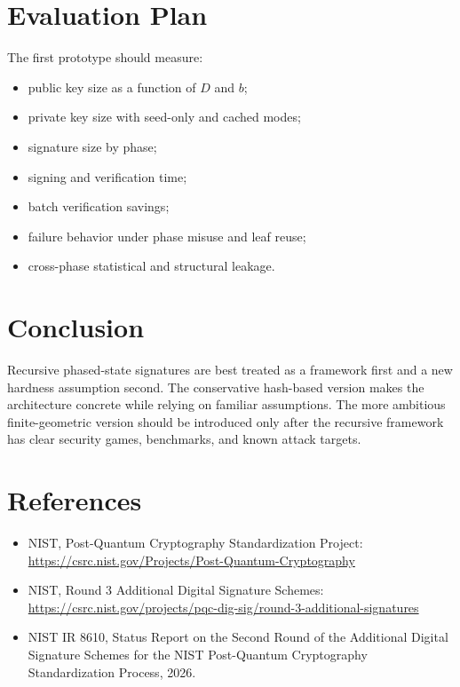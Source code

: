 \documentclass[11pt]{article}
\begin{document}
\section{Evaluation Plan}

The first prototype should measure:
\begin{itemize}
  \item public key size as a function of $D$ and $b$;
  \item private key size with seed-only and cached modes;
  \item signature size by phase;
  \item signing and verification time;
  \item batch verification savings;
  \item failure behavior under phase misuse and leaf reuse;
  \item cross-phase statistical and structural leakage.
\end{itemize}

\section{Conclusion}

Recursive phased-state signatures are best treated as a framework first and a
new hardness assumption second. The conservative hash-based version makes the
architecture concrete while relying on familiar assumptions. The more ambitious
finite-geometric version should be introduced only after the recursive framework
has clear security games, benchmarks, and known attack targets.

\section*{References}

\begin{itemize}
  \item NIST, Post-Quantum Cryptography Standardization Project:
  \url{https://csrc.nist.gov/Projects/Post-Quantum-Cryptography}
  \item NIST, Round 3 Additional Digital Signature Schemes:
  \url{https://csrc.nist.gov/projects/pqc-dig-sig/round-3-additional-signatures}
  \item NIST IR 8610, Status Report on the Second Round of the Additional
  Digital Signature Schemes for the NIST Post-Quantum Cryptography
  Standardization Process, 2026.
\end{itemize}
\end{document}
